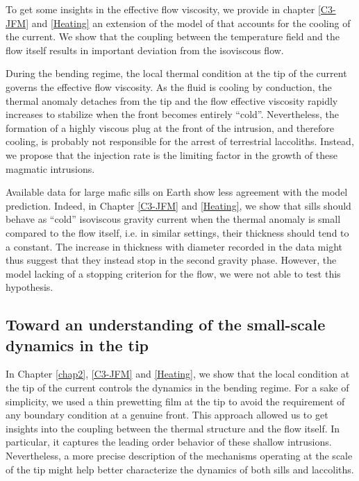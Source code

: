 To get  some insights in the  effective flow viscosity, we  provide in
chapter \ref{C3-JFM}  and \ref{Heating} an  extension of the  model of
\citet{Michaut:2011kg}   that  accounts   for  the   cooling  of   the
current. We show  that the coupling between the  temperature field and
the flow  itself results  in important  deviation from  the isoviscous
flow.

During the bending  regime, the local thermal condition at  the tip of
the current  governs the  effective flow viscosity.   As the  fluid is
cooling by conduction,  the thermal anomaly detaches from  the tip and
the flow effective  viscosity rapidly increases to  stabilize when the
front  becomes entirely  ``cold''.  Nevertheless,  the formation  of a
highly  viscous plug  at the  front  of the  intrusion, and  therefore
cooling, is  probably not  responsible for  the arrest  of terrestrial
laccoliths.   Instead,  we propose  that  the  injection rate  is  the
limiting factor in the growth of these magmatic intrusions.

Available data for large mafic sills on Earth show less agreement with
the   model  prediction.    Indeed,   in   Chapter  \ref{C3-JFM}   and
\ref{Heating}, we show that sills should behave as ``cold'' isoviscous
gravity current when the thermal anomaly is small compared to the flow
itself, i.e.   in similar settings,  their thickness should tend  to a
constant.  The  increase in  thickness with  diameter recorded  in the
data might thus  suggest that they instead stop in  the second gravity
phase.  However,  the model  lacking of a  stopping criterion  for the
flow, we were not able to test this hypothesis.

\subsection{Toward an understanding of the small-scale dynamics in the
  tip}
\label{sec:perspectives}

In Chapter  \ref{chap2}, \ref{C3-JFM} and \ref{Heating},  we show that
the local condition at the tip of the current controls the dynamics in
the  bending  regime.  For  a  sake  of  simplicity,  we used  a  thin
prewetting film  at the tip to  avoid the requirement of  any boundary
condition at a genuine front. This approach allowed us to get insights
into  the  coupling  between  the   thermal  structure  and  the  flow
itself. In particular, it captures the leading order behavior of these
shallow intrusions.   Nevertheless, a more precise  description of the
mechanisms  operating  at the  scale  of  the  tip might  help  better
characterize the dynamics of both sills and laccoliths.

